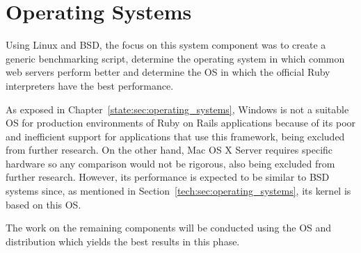 \section{Operating Systems} %
\label{solution:sec:operating_systems}

Using Linux and BSD, the focus on this system component was to create a generic benchmarking script, determine the operating system in which common web servers perform better and determine the OS in which the official Ruby interpreters have the best performance.

As exposed in Chapter~\ref{state:sec:operating_systems}, Windows is not a suitable OS for production environments of Ruby on Rails applications because of its poor and inefficient support for applications that use this framework, being excluded from further research. On the other hand, Mac OS X Server requires specific hardware so any comparison would not be rigorous, also being excluded from further research. However, its performance is expected to be similar to BSD systems since, as mentioned in Section~\ref{tech:sec:operating_systems}, its kernel is based on this OS. 

The work on the remaining components will be conducted using the OS and distribution which yields the best results in this phase.

